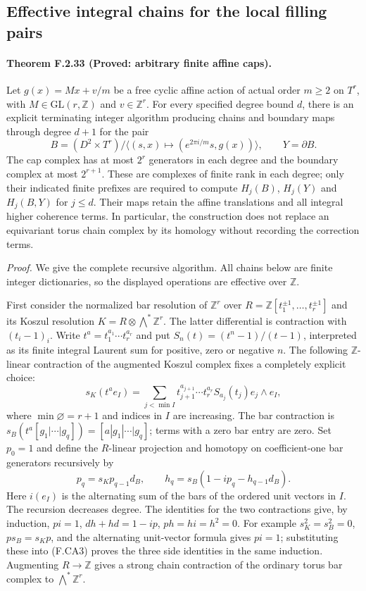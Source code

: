 \subsection*{Effective integral chains for the local filling pairs}

\paragraph{Theorem F.2.33 (Proved: arbitrary finite affine caps).}
Let $g(x)=Mx+v/m$ be a free cyclic affine action of actual order
$m\geq2$ on $T^r$, with $M\in\mathrm{GL}(r,\mathbb Z)$ and
$v\in\mathbb Z^r$.  For every specified degree bound $d$, there is
an explicit terminating integer algorithm producing chains and
boundary maps through degree $d+1$ for the pair
\[
 B=(D^2\times T^r)/\langle(s,x)\mapsto
 (e^{2\pi i/m}s,g(x))\rangle,
 \qquad Y=\partial B.                                      \tag{F.CA1}
\]
The cap complex has at most $2^r$ generators in each degree and
the boundary complex at most $2^{r+1}$.  These are complexes of
finite rank in each degree; only their indicated finite prefixes
are required to compute $H_j(B)$, $H_j(Y)$ and $H_j(B,Y)$ for
$j\leq d$.  Their maps retain the affine translations and all
integral higher coherence terms.  In particular, the construction
does not replace an equivariant torus chain complex by its
homology without recording the correction terms.

\emph{Proof.}
We give the complete recursive algorithm.  All chains below are
finite integer dictionaries, so the displayed operations are
effective over $\mathbb Z$.

First consider the normalized bar resolution of $\mathbb Z^r$
over $R=\mathbb Z[t_1^{\pm1},\ldots,t_r^{\pm1}]$ and its Koszul
resolution $K=R\otimes\bigwedge^*\mathbb Z^r$.
The latter differential is contraction with $(t_i-1)_i$.
Write $t^a=t_1^{a_1}\cdots t_r^{a_r}$ and put
$S_n(t)=(t^n-1)/(t-1)$, interpreted as its finite integral
Laurent sum for positive, zero or negative $n$.
The following $\mathbb Z$-linear contraction of the augmented
Koszul complex fixes a completely explicit choice:
\[
 s_K(t^a e_I)=
 \sum_{j<\min I}
 t_{j+1}^{a_{j+1}}\cdots t_r^{a_r}S_{a_j}(t_j)
 e_j\wedge e_I,                                           \tag{F.CA2}
\]
where $\min\varnothing=r+1$ and indices in $I$ are increasing.
The bar contraction is
$s_B(t^a[g_1|\cdots|g_q])=[a|g_1|\cdots|g_q]$; terms with a
zero bar entry are zero.  Set $p_0=1$ and define the
$R$-linear projection and homotopy on coefficient-one bar
generators recursively by
\[
 p_q=s_Kp_{q-1}d_B,
 \qquad
 h_q=s_B(1-ip_q-h_{q-1}d_B).                               \tag{F.CA3}
\]
Here $i(e_I)$ is the alternating sum of the bars of the ordered
unit vectors in $I$.  The recursion decreases degree.  The
identities for the two contractions give, by induction,
$pi=1$, $dh+hd=1-ip$, $ph=hi=h^2=0$.
For example $s_K^2=s_B^2=0$, $ps_B=s_Kp$, and the alternating
unit-vector formula gives $pi=1$; substituting these into
(F.CA3) proves the three side identities in the same induction.
Augmenting $R\to\mathbb Z$ gives a strong chain contraction
of the ordinary torus bar complex to $\bigwedge^*\mathbb Z^r$.

